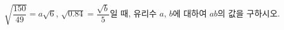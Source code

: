 $\sqrt{\dfrac{150}{49}}=a\sqrt{6}$, $\sqrt{0.84}=\dfrac{\sqrt{b}}{5}$일 때, 유리수 $a$, $b$에 대하여 $ab$의 값을 구하시오.
